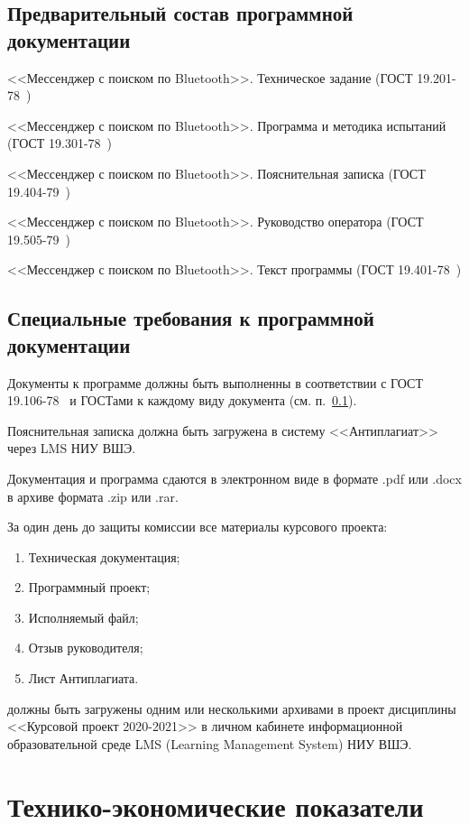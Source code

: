 \documentclass[techtask]{espd}
\begin{document}
\subsection{Предварительный состав программной документации}\label{subsection:documentation}
<<Мессенджер с поиском по Bluetooth>>. Техническое задание (ГОСТ 19.201-78~\cite{espd201})

<<Мессенджер с поиском по Bluetooth>>. Программа и методика испытаний (ГОСТ 19.301-78~\cite{espd301})

<<Мессенджер с поиском по Bluetooth>>. Пояснительная записка (ГОСТ 19.404-79~\cite{espd404})

<<Мессенджер с поиском по Bluetooth>>. Руководство оператора (ГОСТ 19.505-79~\cite{espd505})

<<Мессенджер с поиском по Bluetooth>>. Текст программы (ГОСТ 19.401-78~\cite{espd401})

\subsection{Специальные требования к программной документации}\label{subsection:docspec}
Документы к программе должны быть выполненны в соответствии с ГОСТ 19.106-78~\cite{espd106} и ГОСТами к каждому виду документа (см. п.~\ref{subsection:documentation}).

Пояснительная записка должна быть загружена в систему <<Антиплагиат>> через LMS НИУ ВШЭ.

Документация и программа сдаются в электронном виде в формате .pdf или .docx в архиве формата .zip или .rar.

За один день до защиты комиссии все материалы курсового проекта:
\begin{enumerate}
\item Техническая документация;
\item Программный проект;
\item Исполняемый файл;
\item Отзыв руководителя;
\item Лист Антиплагиата.
\end{enumerate}
должны быть загружены одним или несколькими архивами в проект дисциплины <<Курсовой проект 2020-2021>> в личном кабинете информационной образовательной среде LMS (Learning Management System) НИУ ВШЭ.

\section{Технико-экономические показатели}
\end{document}
